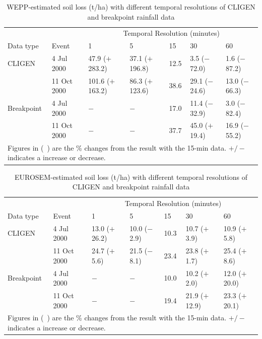 \begin{table}[htbp]
  \centering
  \footnotesize
  \caption[WEPP-estimated soil loss with different temporal resolutions of
CLIGEN and
breakpoint rainfall data]{WEPP-estimated soil loss (t/ha) with different
temporal resolutions of CLIGEN and breakpoint rainfall data}
  \label{tab:DifferentTemporalScalesOfRainfallDataOnWEPPSoilLossEstimation}
    \begin{tabular}{lllllll}
    \toprule
    & & \multicolumn{5}{c}{Temporal Resolution (minutes)}\\
      \cmidrule{3-7}
    Data type & Event & 1 & 5 & 15 & 30 & 60 \\
    \midrule
    CLIGEN & 4 Jul 2000 & 47.9 ($+$283.2) & 37.1 ($+$196.8) & 12.5 & 3.5
($-$72.0) & 1.6 ($-$87.2) \\
     & 11 Oct 2000 & 101.6 ($+$163.2) & 86.3 ($+$123.6) & 38.6 & 29.1 ($-$24.6)
& 13.0 ($-$66.3) \\
     \midrule
    Breakpoint & 4 Jul 2000 & $-$ & $-$ & 17.0 & 11.4 ($-$32.9) & 3.0 ($-$82.4)
\\
     & 11 Oct 2000 & $-$ & $-$ & 37.7 & 45.0 ($+$19.4) & 16.9 ($-$55.2) \\
    \bottomrule
    \multicolumn{7}{p{13cm}}{\footnotesize Figures in (\ ) are the \% changes
from the result with the 15-min data. $+/-$ indicates a increase or decrease.}\\
    \end{tabular}
\end{table}

\begin{table}[htbp]
  \centering
  \footnotesize
  \caption[EUROSEM-estimated soil loss with different temporal resolutions of
CLIGEN
and breakpoint rainfall data]{EUROSEM-estimated soil loss (t/ha) with different
temporal resolutions of CLIGEN and breakpoint rainfall data}
  \label{tab:DifferentTemporalScalesOfRainfallDataOnEUROSEMSoilLoss}
    \begin{tabular}{lllllll}
    \toprule
    & & \multicolumn{5}{c}{Temporal Resolution (minutes)}\\
      \cmidrule{3-7}
    Data type & Event & 1 & 5 & 15 & 30 & 60 \\
    \midrule
    CLIGEN & 4 Jul 2000 & 13.0 ($+$26.2) & 10.0 ($-$2.9) & 10.3 & 10.7 ($+$3.9)
& 10.9 ($+$5.8) \\
     & 11 Oct 2000 & 24.7 ($+$5.6) & 21.5 ($-$8.1) & 23.4 & 23.8 ($+$1.7) & 25.4
($+$8.6) \\
     \midrule
    Breakpoint & 4 Jul 2000 & $-$ & $-$ & 10.0 & 10.2 ($+$2.0) & 12.0 ($+$20.0)
\\
     & 11 Oct 2000 & $-$ & $-$ & 19.4 & 21.9 ($+$12.9) & 23.3 ($+$20.1) \\
    \bottomrule
    \multicolumn{7}{p{12cm}}{\footnotesize Figures in (\ ) are the \% changes
from the result with the 15-min data. $+/-$ indicates a increase or decrease.}\\
    \end{tabular}
\end{table}

